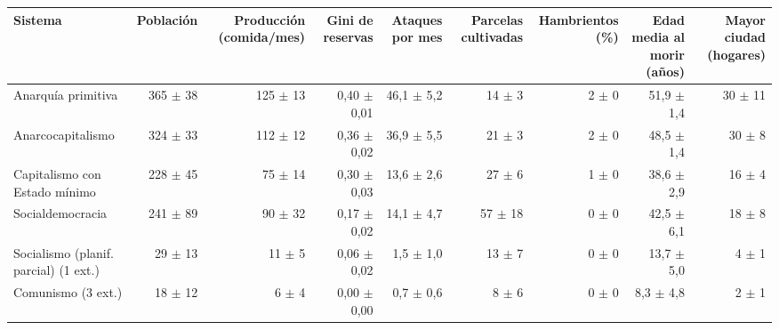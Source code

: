 \begin{tabular}{lrrrrrrrr}
\toprule
Sistema & Población & Producción (comida/mes) & Gini de reservas & Ataques por mes & Parcelas cultivadas & Hambrientos (\%) & Edad media al morir (años) & Mayor ciudad (hogares) \\
\midrule
Anarquía primitiva & 365 $\pm$ 38 & 125 $\pm$ 13 & 0,40 $\pm$ 0,01 & 46,1 $\pm$ 5,2 & 14 $\pm$ 3 & 2 $\pm$ 0 & 51,9 $\pm$ 1,4 & 30 $\pm$ 11 \\
Anarcocapitalismo & 324 $\pm$ 33 & 112 $\pm$ 12 & 0,36 $\pm$ 0,02 & 36,9 $\pm$ 5,5 & 21 $\pm$ 3 & 2 $\pm$ 0 & 48,5 $\pm$ 1,4 & 30 $\pm$ 8 \\
Capitalismo con Estado mínimo & 228 $\pm$ 45 & 75 $\pm$ 14 & 0,30 $\pm$ 0,03 & 13,6 $\pm$ 2,6 & 27 $\pm$ 6 & 1 $\pm$ 0 & 38,6 $\pm$ 2,9 & 16 $\pm$ 4 \\
Socialdemocracia & 241 $\pm$ 89 & 90 $\pm$ 32 & 0,17 $\pm$ 0,02 & 14,1 $\pm$ 4,7 & 57 $\pm$ 18 & 0 $\pm$ 0 & 42,5 $\pm$ 6,1 & 18 $\pm$ 8 \\
Socialismo (planif. parcial) (1 ext.) & 29 $\pm$ 13 & 11 $\pm$ 5 & 0,06 $\pm$ 0,02 & 1,5 $\pm$ 1,0 & 13 $\pm$ 7 & 0 $\pm$ 0 & 13,7 $\pm$ 5,0 & 4 $\pm$ 1 \\
Comunismo (3 ext.) & 18 $\pm$ 12 & 6 $\pm$ 4 & 0,00 $\pm$ 0,00 & 0,7 $\pm$ 0,6 & 8 $\pm$ 6 & 0 $\pm$ 0 & 8,3 $\pm$ 4,8 & 2 $\pm$ 1 \\
\bottomrule
\end{tabular}
